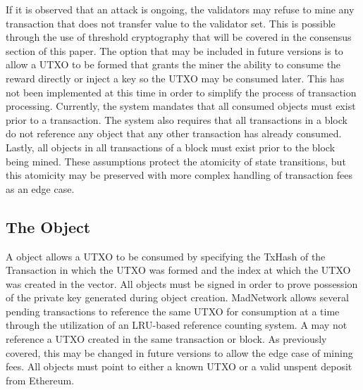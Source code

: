 If it is observed that an attack is ongoing, the validators may refuse
to mine any transaction that does not transfer value to the validator
set.
This is possible through the use of threshold cryptography that will be
covered in the consensus section of this paper.
The option that may be included in future versions is to allow a UTXO
to be formed that grants the miner the ability to consume the reward
directly or inject a key so the UTXO may be consumed later.
This has not been implemented at this time in order to simplify the
process of transaction processing.
Currently, the system mandates that all consumed objects must exist
prior to a transaction.
The system also requires that all transactions in a block do not
reference any object that any other transaction has already consumed.
Lastly, all objects in all transactions of a block must exist prior to
the block being mined.
These assumptions protect the atomicity of state transitions, but this
atomicity may be preserved with more complex handling of transaction
fees as an edge case.


\subsection{The \TxIn{} Object}



A \TxIn{} object allows a UTXO to be consumed by specifying the TxHash of
the Transaction in which the UTXO was formed and the index at which the
UTXO was created in the \Vout{} vector.
All \TxIn{} objects must be signed in order to prove possession of the
private key generated during object creation.
MadNetwork allows several pending transactions to reference the same
UTXO for consumption at a time through the utilization of an LRU-based
reference counting system.
A \TxIn{} may not reference a UTXO created in the same transaction or
block.
As previously covered, this may be changed in future versions to allow
the edge case of mining fees.
All \TxIn{} objects must point to either a known UTXO or a valid unspent
deposit from Ethereum.

